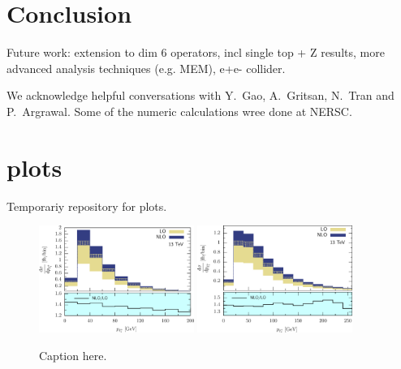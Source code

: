 \documentclass[preprint]{JHEP3} %
\begin{document}
\section{Conclusion}
Future work: extension to dim 6 operators, incl single top + Z results, more advanced analysis techniques (e.g. MEM), e+e- collider.
%


\acknowledgments
We acknowledge helpful conversations with Y.~Gao, A.~Gritsan, N.~Tran and P.~Argrawal. 
Some of the numeric calculations wree done at NERSC.


\appendix
\section{plots}
Temporariy repository for plots.


\begin{figure}[h]
\centering %
\includegraphics[width=0.45\textwidth]{./LHC_53_Fig01.eps}
\hfill
\includegraphics[width=0.45\textwidth]{./LHC_53_Fig03.eps}
\caption{\label{fig:i} Caption here.}
\end{figure}
\end{document}
